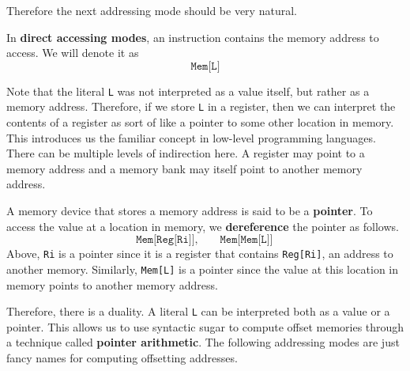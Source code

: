   Therefore the next addressing mode should be very natural. 

  \begin{definition}
    In \textbf{direct accessing modes}, an instruction contains the memory address to access. We will denote it as 
    \begin{equation}
      \texttt{Mem[L]}
    \end{equation}
  \end{definition}

  Note that the literal \texttt{L} was not interpreted as a value itself, but rather as a memory address. Therefore, if we store \texttt{L} in a register, then we can interpret the contents of a register as sort of like a pointer to some other location in memory. This introduces us the familiar concept in low-level programming languages. There can be multiple levels of indirection here. A register may point to a memory address and a memory bank may itself point to another memory address. 

  \begin{definition}[Pointer]
    A memory device that stores a memory address is said to be a \textbf{pointer}. To access the value at a location in memory, we \textbf{dereference} the pointer as follows. 
    \begin{equation}
      \texttt{Mem[Reg[Ri]]}, \qquad \texttt{Mem[Mem[L]]}
    \end{equation}
    Above, \texttt{Ri} is a pointer since it is a register that contains \texttt{Reg[Ri]}, an address to another memory. Similarly, \texttt{Mem[L]} is a pointer since the value at this location in memory points to another memory address. 
  \end{definition}

  Therefore, there is a duality. A literal \texttt{L} can be interpreted both as a value or a pointer. This allows us to use syntactic sugar to compute offset memories through a technique called \textbf{pointer arithmetic}. The following addressing modes are just fancy names for computing offsetting addresses. 

